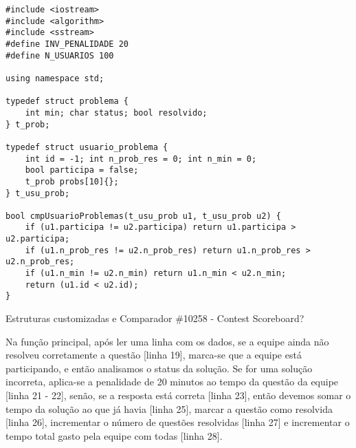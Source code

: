 \documentclass[a4paper,12pt]{scrartcl}
\begin{document}
\begin{listing}[H]
\begin{verbatim}
#include <iostream>
#include <algorithm>
#include <sstream>
#define INV_PENALIDADE 20
#define N_USUARIOS 100

using namespace std;

typedef struct problema {
    int min; char status; bool resolvido;
} t_prob;

typedef struct usuario_problema {
    int id = -1; int n_prob_res = 0; int n_min = 0;
    bool participa = false;
    t_prob probs[10]{};
} t_usu_prob;

bool cmpUsuarioProblemas(t_usu_prob u1, t_usu_prob u2) {
    if (u1.participa != u2.participa) return u1.participa > u2.participa;
    if (u1.n_prob_res != u2.n_prob_res) return u1.n_prob_res > u2.n_prob_res;
    if (u1.n_min != u2.n_min) return u1.n_min < u2.n_min;
    return (u1.id < u2.id);
}
\end{verbatim}
\caption{\footnotesize{Estruturas customizadas e Comparador \#10258 - Contest Scoreboard?}}
\end{listing}
Na função principal, após ler uma linha com os dados, se a equipe ainda não resolveu corretamente a questão [linha 19], marca-se que a equipe está participando, e então analisamos o status da solução. Se for uma solução incorreta, aplica-se a penalidade de 20 minutos ao tempo da questão da equipe [linha 21 - 22], senão, se a resposta está correta [linha 23], então devemos somar o tempo da solução ao que já havia [linha 25], marcar a questão como resolvida [linha 26], incrementar o número de questões resolvidas [linha 27] e incrementar o tempo total gasto pela equipe com todas [linha 28].
\end{document}

